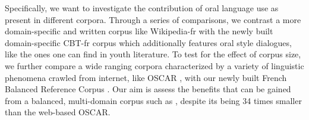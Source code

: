 Specifically, we want to investigate the contribution of oral language use as present in different corpora. Through a series of comparisons, we contrast a more domain-specific and written corpus like Wikipedia-fr with the newly built domain-specific CBT-fr corpus which additionally features oral style dialogues, like the ones one can find in youth literature. To test for the effect of corpus size, we further compare a wide ranging corpora characterized by a variety of linguistic phenomena crawled from internet, like OSCAR \citep{ortiz-suarez-etal-2019-asynchronous}, with our newly built French Balanced Reference Corpus \Cabernet.
Our aim is assess the benefits that can be gained from a balanced, multi-domain corpus such as \Cabernet, despite its being 34 times smaller than the web-based OSCAR.







